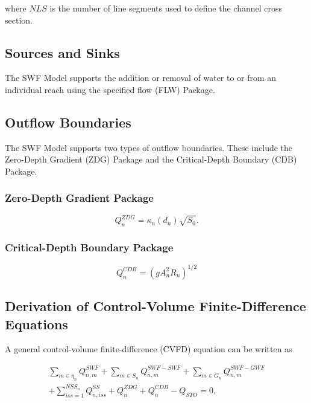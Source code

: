 \documentclass[fleqn]{article}
\begin{document}
\noindent where $NLS$ is the number of line segments used to define the channel cross section.


\subsection{Sources and Sinks}

The SWF Model supports the addition or removal of water to or from an individual reach using the specified flow (FLW) Package.  


\subsection{Outflow Boundaries}
The SWF Model supports two types of outflow boundaries.  These include the Zero-Depth Gradient (ZDG) Package and the Critical-Depth Boundary (CDB) Package.

\subsubsection{Zero-Depth Gradient Package}

\begin{equation}
  Q_{n}^{ZDG} = 
  \kappa_n \left ( d_n \right ) \sqrt{S_0} .
\label{eqn:qzdg}
\end{equation}


\subsubsection{Critical-Depth Boundary Package}

\begin{equation}
  Q_{n}^{CDB} = 
  \left ( g A_n^2 R_n \right )^{1/2}
\label{eqn:qcdb}
\end{equation}


\subsection{Derivation of Control-Volume Finite-Difference Equations}

A general control-volume finite-difference (CVFD) equation can be written as

\begin{equation}
  \label{eqn:cvfd}
  \begin{split}
  \sum \limits_{m \in \eta_{n}} Q_{n,m}^{SWF}
  + \sum \limits_{m \in S_{n}} Q_{n,m}^{SWF-SWF}
  + \sum \limits_{m \in G_{n}} Q_{n,m}^{SWF-GWF} \\
  + \sum \limits_{iss=1}^{NSS_n} Q_{n,iss}^{SS}
  + Q_n^{ZDG}
  + Q_n^{CDB}
  - Q_{STO} 
  = 
  0,
  \end{split}
\end{equation}
  
\end{document}
